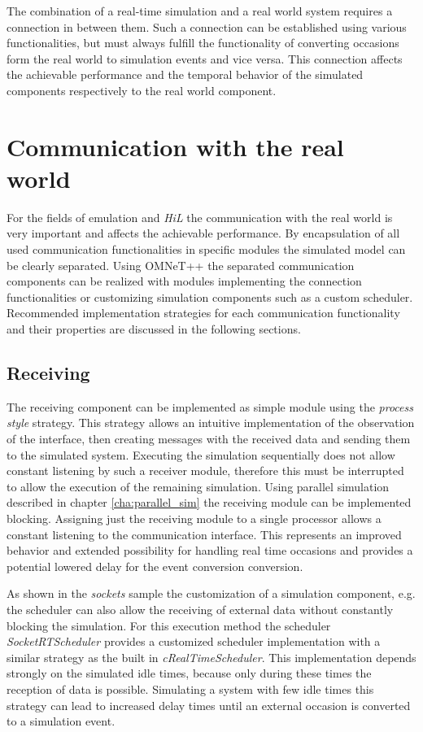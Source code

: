 The combination of a real-time simulation and a real world system requires a connection in between them.
Such a connection can be established using various functionalities, but must always fulfill the functionality of converting occasions form the real world to simulation events and vice versa.
This connection affects the achievable performance and the temporal behavior of the simulated components respectively to the real world component.

\section{Communication with the real world}
\label{sec:emulation_communication}
For the fields of emulation and \emph{HiL} the communication with the real world is very important and affects the achievable performance.
By encapsulation of all used communication functionalities in specific modules the simulated model can be clearly separated.
Using OMNeT++ the separated communication components can be realized with modules implementing the connection functionalities or customizing simulation components such as a custom scheduler.
Recommended implementation strategies for each communication functionality and their properties are discussed in the following sections.

\subsection{Receiving}
\label{sec:emulation_communication_receiving}

The receiving component can be implemented as simple module using the \emph{process style} strategy.
This strategy allows an intuitive implementation of the observation of the interface, then creating messages with the received data and sending them to the simulated system.
Executing the simulation sequentially does not allow constant listening by such a receiver module, therefore this must be interrupted to allow the execution of the remaining simulation.
Using parallel simulation described in chapter \ref{cha:parallel_sim} the receiving module can be implemented blocking.
Assigning just the receiving module to a single processor allows a constant listening to the communication interface.
This represents an improved behavior and extended possibility for handling real time occasions and provides a potential lowered delay for the event conversion conversion.

As shown in the \emph{sockets} sample the customization of a simulation component, e.g. the scheduler can also allow the receiving of external data without constantly blocking the simulation.
For this execution method the scheduler \emph{SocketRTScheduler} provides a customized scheduler implementation with a similar strategy as the built in \emph{cRealTimeScheduler}.
This implementation depends strongly on the simulated idle times, because only during these times the reception of data is possible.
Simulating a system with few idle times this strategy can lead to increased delay times until an external occasion is converted to a simulation event.


